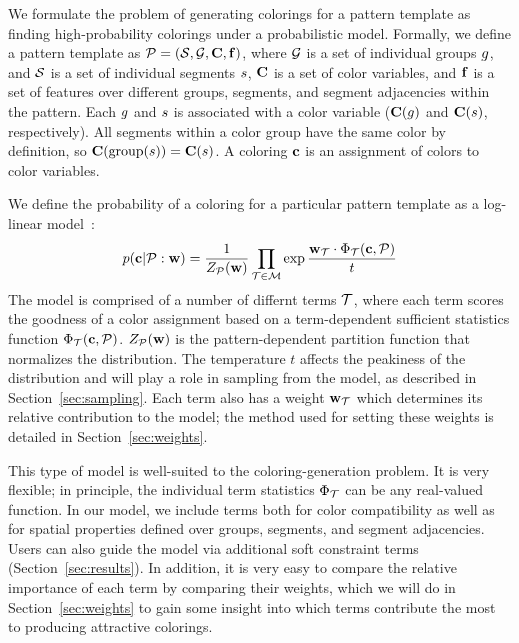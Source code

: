 
We formulate the problem of generating colorings for a pattern template as finding high-probability colorings under a probabilistic model. Formally, we define a pattern template as $\mathcal{P} = (\mathcal{S}, \mathcal{G}, \mathbf{C}, \mathbf{f})$, where $\mathcal{G}$ is a set of individual groups $g$, and $\mathcal{S}$ is a set of individual segments $s$, $\mathbf{C}$ is a set of color variables, and $\mathbf{f}$ is a set of features over different groups, segments, and segment adjacencies within the pattern. Each $g$ and $s$ is associated with a color variable ($\mathbf{C}(g)$ and $\mathbf{C}(s)$, respectively). All segments within a color group have the same color by definition, so $\mathbf{C}(\text{group}(s)) = \mathbf{C}(s)$. A coloring $\mathbf{c}$ is an assignment of colors to color variables.

We define the probability of a coloring for a particular pattern template as a log-linear model~\cite{LogLinearModels}:  
\begin{equation*}
 p(\mathbf{c} | \mathcal{P} : \mathbf{w}) = \frac{1}{Z_{\mathcal{P}}(\mathbf{w})} \prod_{\mathcal{T} \in \mathcal{M}} \exp{\frac{ \mathbf{w}_{\mathcal{T}}\cdot \Phi_{\mathcal{T}}(\mathbf{c}, \mathcal{P})}{t}}
\end{equation*}
The model is comprised of a number of differnt terms $\mathcal{T}$, where each term scores the goodness of a color assignment based on a term-dependent sufficient statistics function $\Phi_{\mathcal{T}}(\mathbf{c},\mathcal{P})$. $Z_{\mathcal{P}}(\mathbf{w})$ is the pattern-dependent partition function that normalizes the distribution. The temperature $t$ affects the peakiness of the distribution and will play a role in sampling from the model, as described in Section~\ref{sec:sampling}. Each term also has a weight $\mathbf{w}_{\mathcal{T}}$ which determines its relative contribution to the model; the method used for setting these weights is detailed in Section~\ref{sec:weights}.

This type of model is well-suited to the coloring-generation problem. It is very flexible; in principle, the individual term statistics $\Phi_{\mathcal{T}}$ can be any real-valued function. In our model, we include terms both for color compatibility as well as for spatial properties defined over groups, segments, and segment adjacencies. Users can also guide the model via additional soft constraint terms (Section~\ref{sec:results}). In addition, it is very easy to compare the relative importance of each term by comparing their weights, which we will do in Section~\ref{sec:weights} to gain some insight into which terms contribute the most to producing attractive colorings.

